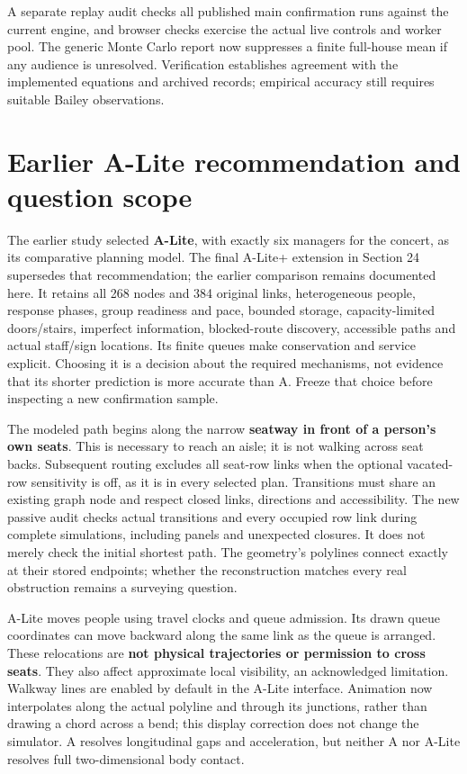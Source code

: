 \documentclass[11pt,a4paper]{article}
\begin{document}
A separate replay audit checks all published main confirmation runs against the current engine, and browser checks exercise the actual live controls and worker pool. The generic Monte Carlo report now suppresses a finite full-house mean if any audience is unresolved. Verification establishes agreement with the implemented equations and archived records; empirical accuracy still requires suitable Bailey observations.


\section{Earlier A-Lite recommendation and question scope}\label{sec:22}

The earlier study selected \textbf{A-Lite}, with exactly six managers for the concert, as its comparative planning model. The final A-Lite+ extension in Section 24 supersedes that recommendation; the earlier comparison remains documented here. It retains all 268 nodes and 384 original links, heterogeneous people, response phases, group readiness and pace, bounded storage, capacity-limited doors/stairs, imperfect information, blocked-route discovery, accessible paths and actual staff/sign locations. Its finite queues make conservation and service explicit. Choosing it is a decision about the required mechanisms, not evidence that its shorter prediction is more accurate than A. Freeze that choice before inspecting a new confirmation sample.


The modeled path begins along the narrow \textbf{seatway in front of a person's own seats}. This is necessary to reach an aisle; it is not walking across seat backs. Subsequent routing excludes all seat-row links when the optional vacated-row sensitivity is off, as it is in every selected plan. Transitions must share an existing graph node and respect closed links, directions and accessibility. The new passive audit checks actual transitions and every occupied row link during complete simulations, including panels and unexpected closures. It does not merely check the initial shortest path. The geometry's polylines connect exactly at their stored endpoints; whether the reconstruction matches every real obstruction remains a surveying question.


A-Lite moves people using travel clocks and queue admission. Its drawn queue coordinates can move backward along the same link as the queue is arranged. These relocations are \textbf{not physical trajectories or permission to cross seats}. They also affect approximate local visibility, an acknowledged limitation. Walkway lines are enabled by default in the A-Lite interface. Animation now interpolates along the actual polyline and through its junctions, rather than drawing a chord across a bend; this display correction does not change the simulator. A resolves longitudinal gaps and acceleration, but neither A nor A-Lite resolves full two-dimensional body contact.
\end{document}
